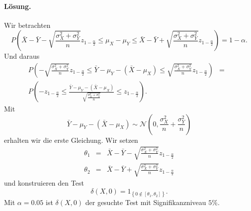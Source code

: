 \paragraph*{Lösung.} Wir betrachten
\begin{equation}
    P\left( \bar X - \bar Y - \sqrt{ \frac{\sigma^2_X + \sigma^2_Y}{n}  }z_{1-\frac{\alpha}{2}} \leq \mu_X - \mu_Y \leq \bar X - \bar Y + \sqrt{ \frac{\sigma^2_X + \sigma^2_Y}{n}  }z_{1-\frac{\alpha}{2}}   \right) = 1-\alpha.
\end{equation}
Und daraus
\begin{eqnarray}
    P \left(  - \sqrt{ \frac{\sigma^2_X + \sigma^2_Y}{n}  }z_{1-\frac{\alpha}{2}} \leq
    \bar Y -\mu_Y -\left( \bar X - \mu_X \right) \leq 
    \sqrt{ \frac{\sigma^2_X + \sigma^2_Y}{n}  }z_{1-\frac{\alpha}{2}}
    \right) &=& \\ 
    P \left(  - z_{1-\frac{\alpha}{2}} \leq
    \frac{ \bar Y -\mu_Y -\left( \bar X - \mu_X \right)  }{  \sqrt{ \frac{\sigma^2_X + \sigma^2_Y}{n}  } } 
    \leq  z_{1-\frac{\alpha}{2}} 
    \right).
\end{eqnarray}
Mit
\begin{equation}
    \bar Y - \mu_Y - \left( \bar X - \mu_X \right) \sim 
    \mathcal N\left(0, \frac{\sigma^2_X}{n} + \frac{\sigma^2_Y}{n}   \right)
\end{equation}
erhalten wir die erste Gleichung.  
Wir setzen
\begin{eqnarray}
    \theta_1 &=& \bar X - \bar Y - \sqrt{ \frac{\sigma^2_X + \sigma^2_Y}{n}  }z_{1-\frac{\alpha}{2}} \\
    \theta_2 &=& \bar X - \bar Y + \sqrt{ \frac{\sigma^2_X + \sigma^2_Y}{n}  }z_{1-\frac{\alpha}{2}} 
\end{eqnarray}
und konstruieren den Test
\begin{equation}
    \delta\left( X,0 \right) = 1_{ \left\{ 0 \nin \left[ \theta_1,\theta_2 \right] \right\} }.
\end{equation}
Mit $\alpha=0.05$ ist $\delta(X,0)$ der gesuchte Test mit Signifikanzniveau $5\%$.

